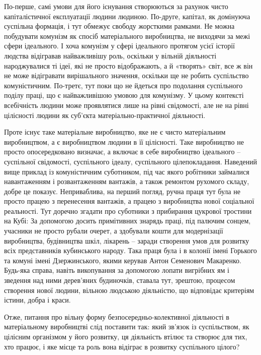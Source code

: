 \documentclass[12pt,a4paper,openany]{book}
\begin{document}
По-перше, самі умови для його існування створюються за рахунок чисто капіталістичної експлуатації людини людиною. По-друге, капітал, як домінуюча суспільна формація, і тут обмежує свободу жорсткими рамками. Не можна побудувати комунізм як спосіб матеріального виробництва, не виходячи за межі сфери ідеального. І хоча комунізм у сфері ідеального протягом усієї історії людства відігравав найважливішу роль, оскільки у вільній діяльності народжувалися ті ідеї, які не просто відображають, а й «творять» світ, все ж він не може відігравати вирішального значення, оскільки ще не робить суспільство комуністичним. По-третє, тут поки що не йдеться про подолання суспільного поділу праці, що є найважливішою умовою для комунізму. У цьому контексті всебічність людини може проявлятися лише на рівні свідомості, але не на рівні цілісності людини як суб’єкта матеріально-практичної діяльності.

Проте існує таке матеріальне виробництво, яке не є чисто матеріальним виробництвом, а є виробництвом людини в її цілісності. Таке виробництво не просто опосередковано визначає, а включає в себе виробництво ідеального – суспільної свідомості, суспільного ідеалу, суспільного цілепокладання. Наведений вище приклад із комуністичним суботником, під час якого робітники займалися навантаженням і розвантаженням вантажів, а також ремонтом рухомого складу, добре це показує. Неприваблива, на перший погляд, ручна праця тут була не просто працею з перенесення вантажів, а працею з виробництва нової соціальної реальності. Тут доречно згадати про суботники з прибирання цукрової тростини на Кубі: За допомогою досить примітивних знарядь праці, під палючим сонцем, учасники не просто рубали очерет, а здобували кошти для модернізації виробництва, будівництва шкіл, лікарень – заради створення умов для розвитку всіх представників кубинського народу. Така праця була і в колонії імені Горького та комуні імені Дзержинського, якими керував Антон Семенович Макаренко. Будь-яка справа, навіть викопування за допомогою лопати вигрібних ям і зведення над ними дерев’яних будиночків, ставала тут, зрештою, процесом створення нової людини, вільною людською діяльністю, що відповідає критеріям істини, добра і краси.

Отже, питання про вільну форму безпосередньо-колективної діяльності в матеріальному виробництві слід поставити так: який зв’язок із суспільством, як цілісним організмом у його розвитку, ця діяльність втілює та створює для тих, хто працює, і яке місце та роль вона відіграє в розвитку суспільного цілого?
\end{document}
